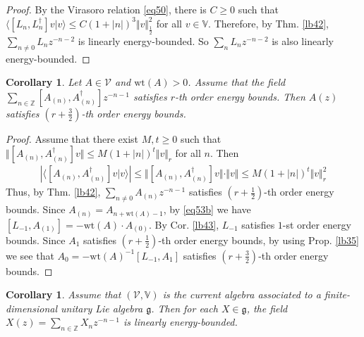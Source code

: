 \documentclass[12pt,b5paper,notitlepage]{article}
\theoremstyle{definition}
\theoremstyle{plain}
\newtheorem{co}[df]{Corollary}
\newcommand{\mc}{\mathcal}
\newcommand{\bk}[1]{\langle {#1}\rangle}
\newcommand{\gk}{\mathfrak g}
\newcommand{\Vbb}{\mathbb V}
\newcommand{\Zbb}{\mathbb Z}
\newcommand{\wt}{\mathrm{wt}}
\numberwithin{equation}{section}
\begin{document}
\begin{proof}
By the Virasoro relation \eqref{eq50}, there is $C\geq0$ such that $\bk{[L_n,L_n^\dagger]v|v}\leq C(1+|n|)^3\Vert v\Vert_{\frac 12}^2$ for all $v\in\Vbb$. Therefore, by Thm. \ref{lb42}, $\sum_{n\neq 0}L_nz^{-n-2}$ is linearly energy-bounded. So $\sum_n L_nz^{-n-2}$ is also linearly energy-bounded.
\end{proof}


\begin{co}
Let $A\in\mc V$ and $\wt(A)>0$. Assume that the field $\sum_{n\in\Zbb}[A_{(n)},A_{(n)}^\dagger]z^{-n-1}$ satisfies $r$-th order energy bounds. Then $A(z)$ satisfies $(r+\frac 32)$-th order energy bounds.
\end{co}

\begin{proof}
Assume that there exist $M,t\geq0$ such that $\Vert[A_{(n)},A_{(n)}^\dagger]v\Vert\leq M(1+|n|)^t\Vert v\Vert_r$ for all $n$. Then
\begin{align*}
|\bk{[A_{(n)},A_{(n)}^\dagger]v|v}|\leq \Vert[A_{(n)},A_{(n)}^\dagger]v\Vert\cdot \Vert v\Vert\leq M(1+|n|)^t\Vert v\Vert_r^2
\end{align*}
Thus, by Thm. \ref{lb42}, $\sum_{n\neq 0}A_{(n)}z^{-n-1}$ satisfies $(r+\frac 12)$-th order energy bounds. Since $A_{(n)}=A_{n+\wt(A)-1}$, by \eqref{eq53b} we have $[L_{-1},A_{(1)}]=-\wt(A)\cdot A_{(0)}$. By Cor. \ref{lb43}, $L_{-1}$ satisfies $1$-st order energy bounds. Since $A_1$ satisfies $(r+\frac 12)$-th order energy bounds, by using Prop. \ref{lb35} we see that $A_0=-\wt(A)^{-1}[L_{-1},A_1]$ satisfies $(r+\frac 32)$-th order energy bounds.
\end{proof}


\begin{co}\label{lb109}
Assume that $(\mc V,\Vbb)$ is the current algebra associated to a finite-dimensional unitary Lie algebra $\gk$. Then for each $X\in\gk$, the field $X(z)=\sum_{n\in\Zbb}X_nz^{-n-1}$ is linearly energy-bounded.
\end{co}
\end{document}
